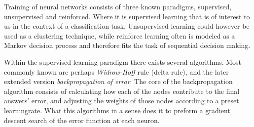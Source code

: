 	
	\bigskip\noindent
	Training of neural networks consists of three known paradigms, supervised, unsupervised and reinforced. 
	Where it is supervised learning that is of interest to us in the context of a classification task. 
	Unsupervised learning could however be used as a clustering technique, 
	while reinforce learning often is modeled as a Markov decision process and therefore fits the task of sequential decision making. \cite{bioAI}
	
	\bigskip\noindent
	Within the supervised learning paradigm there exists several algorithms. 
	Most commonly known are perhaps \textit{Widrow-Hoff} rule (delta rule)\cite{widrowhoff}, and the later extended version \textit{backpropagation of error}\cite{rumelhart1986learning}\cite{rumelhart1986parallel}. 
	The core of the backpropagation algorithm consists of calculating how each of the nodes contribute to the final answers' error, 
	and adjusting the weights of those nodes according to a preset learningrate. 
	What this algorithms in a sense does it to preform a gradient descent search of the error function at each neuron.
	
	
	
	
	
	